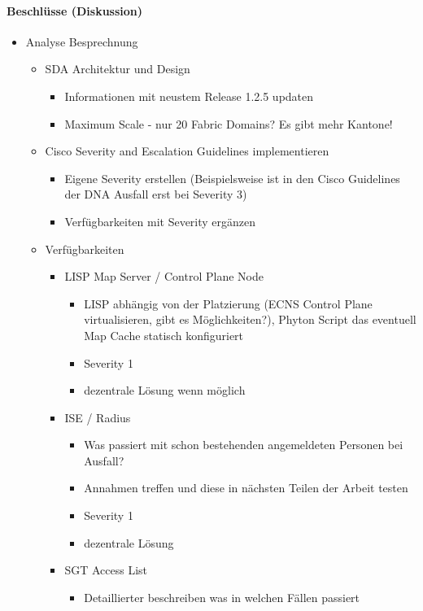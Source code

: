 \paragraph{Beschlüsse (Diskussion)}
\begin{itemize}
	\item Analyse Besprechnung
	\begin{itemize}
		\item SDA Architektur und Design
		\begin{itemize}
			\item Informationen mit neustem Release 1.2.5 updaten
			\item Maximum Scale - nur 20 Fabric Domains? Es gibt mehr Kantone!
		\end{itemize}
		\item Cisco Severity and Escalation Guidelines implementieren
		\begin{itemize}
			\item Eigene Severity erstellen (Beispielsweise ist in den Cisco Guidelines der DNA Ausfall erst bei Severity 3) 
			\item Verfügbarkeiten mit Severity ergänzen
		\end{itemize}
		\item Verfügbarkeiten
		\begin{itemize}
			\item LISP Map Server / Control Plane Node
			\begin{itemize}
				\item LISP abhängig von der Platzierung (ECNS Control Plane virtualisieren, gibt es Möglichkeiten?), Phyton Script das eventuell Map Cache statisch konfiguriert
				\item Severity 1
				\item dezentrale Lösung wenn möglich
			\end{itemize}
			\item ISE / Radius
			\begin{itemize}
				\item Was passiert mit schon bestehenden angemeldeten Personen bei Ausfall?
				\item Annahmen treffen und diese in nächsten Teilen der Arbeit testen
				\item Severity 1
				\item dezentrale Lösung
			\end{itemize}
			\item SGT Access List
			\begin{itemize}
				\item Detaillierter beschreiben was in welchen Fällen passiert

\end{itemize}
\end{itemize}
\end{itemize}
\end{itemize}
